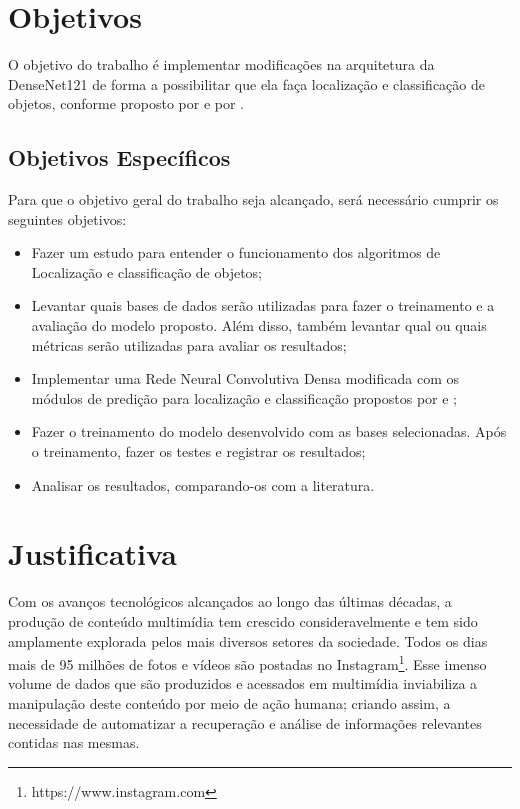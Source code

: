 \section{Objetivos}
\label{secao:1:2}  

O objetivo do trabalho é implementar modificações na arquitetura da \ac{DenseNet}121 de forma a possibilitar que ela faça localização e classificação de objetos, conforme proposto por  e por .

\subsection{Objetivos Específicos}

Para que o objetivo geral do trabalho seja alcançado, será necessário cumprir os seguintes objetivos:

\begin{itemize}
	\item Fazer um estudo para entender o funcionamento dos algoritmos de Localização e classificação de objetos;
	\item Levantar quais bases de dados serão utilizadas para fazer o treinamento e a avaliação do modelo proposto. Além disso, também levantar qual ou quais métricas serão utilizadas para avaliar os resultados;
	\item Implementar uma Rede Neural Convolutiva Densa modificada com os módulos de predição para localização e classificação propostos por  e ;
	\item Fazer o treinamento do modelo desenvolvido com as bases selecionadas. Após o treinamento, fazer os testes e registrar os resultados;
	\item Analisar os resultados, comparando-os com a literatura.
\end{itemize}

\section{Justificativa}
\label{secao:1:3}

Com os avanços tecnológicos alcançados ao longo das últimas décadas, a produção de conteúdo multimídia tem crescido consideravelmente e tem sido amplamente explorada pelos mais diversos setores da sociedade. Todos os dias mais de 95 milhões de fotos e vídeos são postadas no Instagram\footnote{https://www.instagram.com}. Esse imenso volume de dados que são produzidos e acessados em multimídia inviabiliza a manipulação deste conteúdo por meio de ação humana; criando assim, a necessidade de automatizar a recuperação e análise de informações relevantes contidas nas mesmas.

